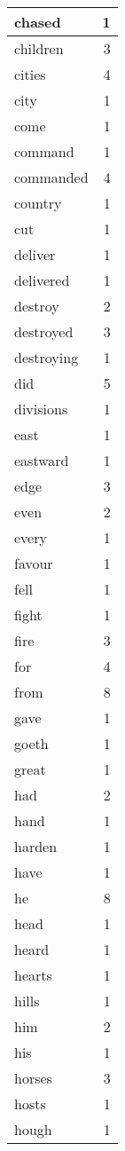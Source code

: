 \begin{center}
\begin{longtable}{l|r}
chased & 1 \\ \hline
children & 3 \\ \hline
cities & 4 \\ \hline
city & 1 \\ \hline
come & 1 \\ \hline
command & 1 \\ \hline
commanded & 4 \\ \hline
country & 1 \\ \hline
cut & 1 \\ \hline
deliver & 1 \\ \hline
delivered & 1 \\ \hline
destroy & 2 \\ \hline
destroyed & 3 \\ \hline
destroying & 1 \\ \hline
did & 5 \\ \hline
divisions & 1 \\ \hline
east & 1 \\ \hline
eastward & 1 \\ \hline
edge & 3 \\ \hline
even & 2 \\ \hline
every & 1 \\ \hline
favour & 1 \\ \hline
fell & 1 \\ \hline
fight & 1 \\ \hline
fire & 3 \\ \hline
for & 4 \\ \hline
from & 8 \\ \hline
gave & 1 \\ \hline
goeth & 1 \\ \hline
great & 1 \\ \hline
had & 2 \\ \hline
hand & 1 \\ \hline
harden & 1 \\ \hline
have & 1 \\ \hline
he & 8 \\ \hline
head & 1 \\ \hline
heard & 1 \\ \hline
hearts & 1 \\ \hline
hills & 1 \\ \hline
him & 2 \\ \hline
his & 1 \\ \hline
horses & 3 \\ \hline
hosts & 1 \\ \hline
hough & 1 \\ \hline

\end{longtable}
\end{center}
